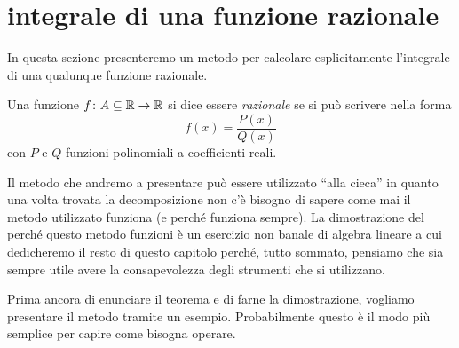 %
%
%
\section{integrale di una funzione razionale}
%
In questa sezione presenteremo un metodo per
calcolare esplicitamente l'integrale di una qualunque funzione razionale.

\begin{definition}
Una funzione $f\colon A \subseteq \mathbb R \to \mathbb R$
si dice essere \emph{razionale} se si può scrivere nella forma
\[
  f(x) = \frac{P(x)}{Q(x)}
\]
con $P$ e $Q$ funzioni polinomiali a coefficienti reali.
\end{definition}

Il metodo che andremo a presentare può essere utilizzato ``alla cieca'' in
quanto una volta trovata la decomposizione non c'è bisogno di sapere
come mai il metodo utilizzato funziona (e perché funziona sempre).
La dimostrazione del perché questo metodo funzioni è un esercizio non
banale di algebra lineare a cui dedicheremo il resto di questo capitolo
perché, tutto sommato, pensiamo che sia sempre utile avere la consapevolezza degli strumenti che si utilizzano.

Prima ancora di enunciare il teorema e di farne la dimostrazione,
vogliamo presentare il metodo tramite un esempio. Probabilmente questo è il modo più semplice per capire come bisogna operare.

